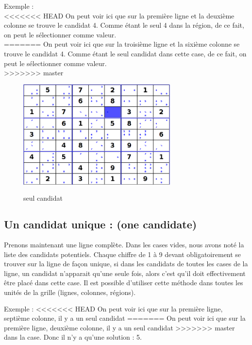Exemple : \\
<<<<<<< HEAD
On peut voir ici que sur la première ligne et la deuxième colonne se trouve le candidat 4.
Comme étant le seul 4 dans la région, de ce fait, on peut le sélectionner comme valeur.\\
=======
On peut voir ici que sur la troisième ligne et la sixième colonne se trouve le candidat 4.
Comme étant le seul candidat dans cette case, de ce fait, on peut le sélectionner comme valeur.\\
>>>>>>> master

\begin{figure}[ht]
  \caption{\label{annexe1} seul candidat}
  \includegraphics [width=80mm]{images/only-candidate.png} \\[0.5cm]
\end{figure}

\newpage

\subsection{Un candidat unique : (one candidate)}
Prenons maintenant une ligne complète. Dans les cases vides, nous avons noté la liste des candidats potentiels. 
Chaque chiffre de 1 à 9 devant obligatoirement se trouver sur la ligne de façon unique, si dans les candidats 
de toutes les cases de la ligne, un candidat n'apparait qu'une seule fois, alors c'est qu'il doit effectivement 
être placé dans cette case.
Il est possible d'utiliser cette méthode dans toutes les unités de la grille (lignes, colonnes, régions).

Exemple :
<<<<<<< HEAD
On peut voir ici que sur la première ligne, septième colonne, il y a un seul candidat 
=======
On peut voir ici que sur la première ligne, deuxième colonne, il y a un seul candidat 
>>>>>>> master
dans la case. Donc il n'y a qu'une solution : 5.\\


